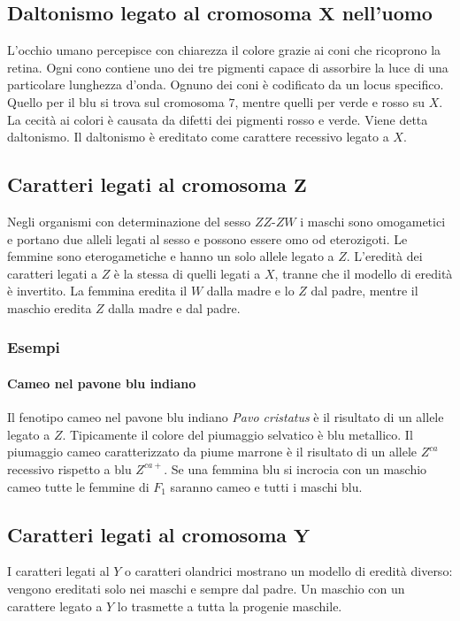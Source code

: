 	\subsection{Daltonismo legato al cromosoma $\mathbf{X}$ nell'uomo}
	L'occhio umano percepisce con chiarezza il colore grazie ai coni che ricoprono la retina.
	Ogni cono contiene uno dei tre pigmenti capace di assorbire la luce di una particolare lunghezza d'onda.
	Ognuno dei coni \`e codificato da un locus specifico.
	Quello per il blu si trova sul cromosoma $7$, mentre quelli per verde e rosso su $X$.
	La cecit\`a ai colori \`e causata da difetti dei pigmenti rosso e verde.
	Viene detta daltonismo.
	Il daltonismo \`e ereditato come carattere recessivo legato a $X$.

	\subsection{Caratteri legati al cromosoma $\mathbf{Z}$}
	Negli organismi con determinazione del sesso $ZZ$-$ZW$ i maschi sono omogametici e portano due alleli legati al sesso e possono essere omo od eterozigoti.
	Le femmine sono eterogametiche e hanno un solo allele legato a $Z$.
	L'eredit\`a dei caratteri legati a $Z$ \`e la stessa di quelli legati a $X$, tranne che il modello di eredit\`a \`e invertito.
	La femmina eredita il $W$ dalla madre e lo $Z$ dal padre, mentre il maschio eredita $Z$ dalla madre e dal padre.

		\subsubsection{Esempi}

			\paragraph{Cameo nel pavone blu indiano}
			Il fenotipo cameo nel pavone blu indiano \emph{Pavo cristatus} \`e il risultato di un allele legato a $Z$.
			Tipicamente il colore del piumaggio selvatico \`e blu metallico.
			Il piumaggio cameo caratterizzato da piume marrone \`e il risultato di un allele $Z^{ca}$ recessivo rispetto a blu $Z^{ca+}$.
			Se una femmina blu si incrocia con un maschio cameo tutte le femmine di $F_1$ saranno cameo e tutti i maschi blu.

	\subsection{Caratteri legati al cromosoma $\mathbf{Y}$}
	I caratteri legati al $Y$ o caratteri olandrici mostrano un modello di eredit\`a diverso: vengono ereditati solo nei maschi e sempre dal padre.
	Un maschio con un carattere legato a $Y$ lo trasmette a tutta la progenie maschile.

